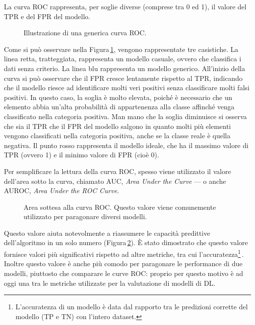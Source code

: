 La curva \acs{ROC} rappresenta, per soglie diverse (comprese tra 0 ed 1), il valore del \acs{TPR} e del \acs{FPR} del modello.
%
\begin{figure}[!t]
    \centering
     
    \caption[Illustrazione di una generica curva ROC.]{Illustrazione di una generica curva ROC.}\label{fig:ROC-curve} 
\end{figure}
% 
Come si può osservare nella Figura\,\ref{fig:ROC-curve}, vengono rappresentate tre casistiche. La linea retta, tratteggiata, rappresenta un modello casuale, ovvero che classifica i dati senza criterio. La linea blu rappresenta un modello generico. All'inizio della curva si può osservare che il \acs{FPR} cresce lentamente rispetto al \acs{TPR}, indicando che il modello riesce ad identificare molti veri positivi senza classificare molti falsi positivi. In questo caso, la soglia è molto elevata, poiché è necessario che un elemento abbia un'alta probabilità di appartenenza alla classe affinché venga classificato nella categoria positiva. Man mano che la soglia diminuisce si osserva che sia il \acs{TPR} che il \acs{FPR} del modello salgono in quanto molti più elementi vengono classificati nella categoria positiva, anche se la classe reale è quella negativa. Il punto rosso rappresenta il modello ideale, che ha il massimo valore di \acs{TPR} (ovvero 1) e il minimo valore di \acs{FPR} (cioè 0).

Per semplificare la lettura della curva \acs{ROC}, spesso viene utilizzato il valore dell'area sotto la curva, chiamato \acs{AUC}, \textit{Area Under the Curve} — o anche \acs{AUROC}, \textit{Area Under the \acs{ROC} Curve}.
% 
\begin{figure}[!b]
    \centering
     
    \caption[Area sottesa alla curva \acs{ROC}.]{Area sottesa alla curva \acs{ROC}. Questo valore viene comunemente utilizzato per paragonare diversi modelli.}\label{fig:AUC-value} 
\end{figure}
% 
Questo valore aiuta notevolmente a riassumere le capacità predittive dell'algoritmo in un solo numero (Figura\,\ref{fig:AUC-value}). È stato dimostrato che questo valore fornisce valori più significativi rispetto ad altre metriche, tra cui l'accuratezza\footnote{L'accuratezza di un modello è data dal rapporto tra le predizioni corrette del modello (TP e TN) con l'intero dataset.}\,\cite{huang2005using}. Inoltre questo valore è anche più comodo per paragonare le performance di due modelli, piuttosto che comparare le curve \acs{ROC}: proprio per questo motivo è ad oggi una tra le metriche utilizzate per la valutazione di modelli di \acs{DL}.



